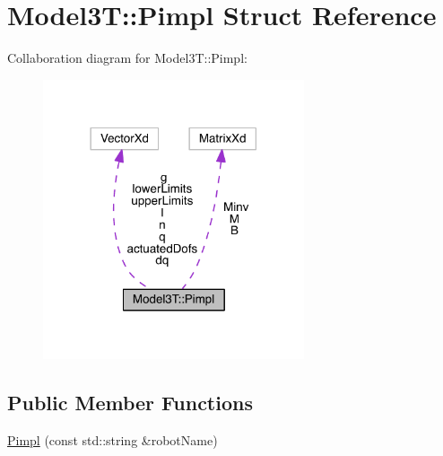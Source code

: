 \hypertarget{structModel3T_1_1Pimpl}{}\section{Model3T\+:\+:Pimpl Struct Reference}
\label{structModel3T_1_1Pimpl}


Collaboration diagram for Model3T\+:\+:Pimpl\+:\nopagebreak
\begin{figure}[H]
\begin{center}
\leavevmode
\includegraphics[width=218pt]{dd/d13/structModel3T_1_1Pimpl__coll__graph}
\end{center}
\end{figure}
\subsection*{Public Member Functions}
\begin{DoxyCompactItemize}
\item 
\hyperlink{structModel3T_1_1Pimpl_a087fecc74d3a9f4867e971a6f4f379ef}{Pimpl} (const std\+::string \&robot\+Name)
\end{DoxyCompactItemize}
